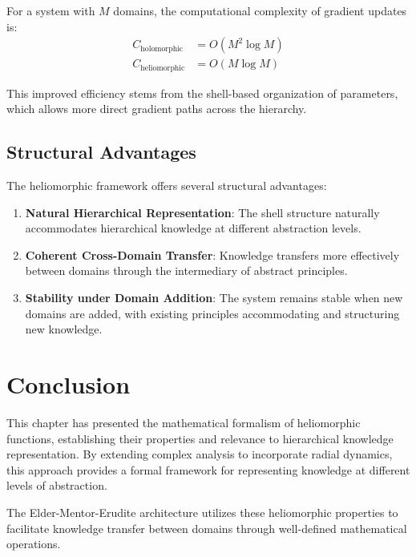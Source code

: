 \begin{proposition}
For a system with $M$ domains, the computational complexity of gradient updates is:
\begin{align}
C_{\text{holomorphic}} &= O(M^2 \log M) \\
C_{\text{heliomorphic}} &= O(M \log M)
\end{align}
\end{proposition}

This improved efficiency stems from the shell-based organization of parameters, which allows more direct gradient paths across the hierarchy.

\subsection{Structural Advantages}

The heliomorphic framework offers several structural advantages:

\begin{enumerate}
    \item \textbf{Natural Hierarchical Representation}: The shell structure naturally accommodates hierarchical knowledge at different abstraction levels.
    
    \item \textbf{Coherent Cross-Domain Transfer}: Knowledge transfers more effectively between domains through the intermediary of abstract principles.
    
    \item \textbf{Stability under Domain Addition}: The system remains stable when new domains are added, with existing principles accommodating and structuring new knowledge.
\end{enumerate}

\section{Conclusion}

This chapter has presented the mathematical formalism of heliomorphic functions, establishing their properties and relevance to hierarchical knowledge representation. By extending complex analysis to incorporate radial dynamics, this approach provides a formal framework for representing knowledge at different levels of abstraction.

The Elder-Mentor-Erudite architecture utilizes these heliomorphic properties to facilitate knowledge transfer between domains through well-defined mathematical operations.